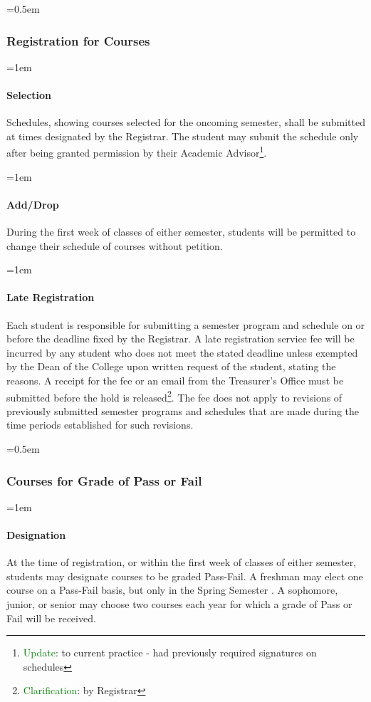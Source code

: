 \documentclass{manual}
\newcommand{\oldbreak}[1]{}
\let\oldsubsubsection\subsubsection
\renewcommand\subsubsection{\leftskip=0.5em\oldsubsubsection}
\let\oldparagraph\paragraph
\renewcommand\paragraph{\leftskip=1em\oldparagraph}
\newcommand{\editRemark}[3]{\textcolor{green}{#2}\footnote{\textcolor{green}{#1}: #3}}
\newcommand{\editRemove}[1]{}
\newcommand{\they}{(pronoun)~ }
\begin{document}
\oldbreak{V-3}

\subsubsection{Registration for Courses}

\paragraph{Selection}
Schedules, showing courses selected for the oncoming semester, shall be submitted at times designated by the Registrar. The student may submit the schedule only after being granted permission by their Academic Advisor\editRemark{Update}{}{to current practice - had previously required signatures on schedules}.

\paragraph{Add/Drop}
During the first week of classes of either semester, students will be permitted to change their schedule of courses without petition.

\paragraph{Late Registration}
Each student is responsible for submitting a semester program and schedule on or before the deadline fixed by the Registrar. A late registration service fee will be incurred by any student who does not meet the stated deadline unless \editRemove{\they is} exempted by the Dean of the College upon written request of the student, stating the reasons. A receipt for the fee or an email from the Treasurer's Office must be submitted before the hold is released\editRemark{Clarification}{}{by Registrar}. The fee does not apply to revisions of previously submitted semester programs and schedules that are made during the time periods established for such revisions.

\subsubsection{Courses for Grade of \textbf{Pass} or Fail}\label{sub:CoursesForGradeOfPassOrFail}

\paragraph{Designation}
At the time of registration, or within the first week of classes of either semester, students may designate courses to be graded Pass-Fail. A freshman may elect one course on a Pass-Fail basis, but only in the Spring Semester . A sophomore, junior, or senior may choose two courses each year for which \editRemove{\they will receive} a grade of Pass or Fail will be received. 
\end{document}
